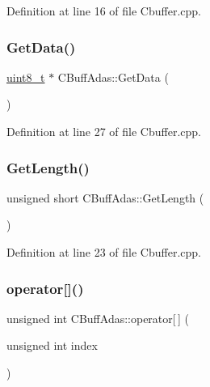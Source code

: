 Definition at line 16 of file Cbuffer.\+cpp.

\mbox{\label{class_c_buff_adas_a56fdcdc9766874d3a6fef04119ee91f9}} 
\subsubsection{\texorpdfstring{GetData()}{GetData()}}
{\footnotesize\ttfamily \mbox{\hyperlink{_a_d_a_s___types_8h_aba7bc1797add20fe3efdf37ced1182c5}{uint8\+\_\+t}} $\ast$ C\+Buff\+Adas\+::\+Get\+Data (\begin{DoxyParamCaption}{ }\end{DoxyParamCaption})}



Definition at line 27 of file Cbuffer.\+cpp.

\mbox{\label{class_c_buff_adas_aa17f6536175e0aafe8ab7b307decf279}} 
\subsubsection{\texorpdfstring{GetLength()}{GetLength()}}
{\footnotesize\ttfamily unsigned short C\+Buff\+Adas\+::\+Get\+Length (\begin{DoxyParamCaption}{ }\end{DoxyParamCaption})}



Definition at line 23 of file Cbuffer.\+cpp.

\mbox{\label{class_c_buff_adas_aedceb4a4bcc47b6e4150a821f0494862}} 
\subsubsection{\texorpdfstring{operator[]()}{operator[]()}}
{\footnotesize\ttfamily unsigned int C\+Buff\+Adas\+::operator\mbox{[}$\,$\mbox{]} (\begin{DoxyParamCaption}\item[{unsigned int}]{index }\end{DoxyParamCaption})}



